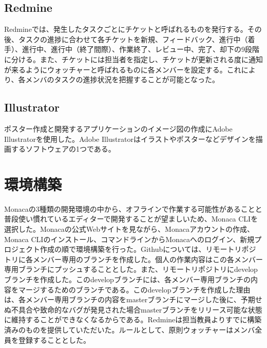 \subsection{Redmine}%
Redmineでは、発生したタスクごとにチケットと呼ばれるものを発行する。その後、タスクの進捗に合わせて各チケットを新規、フィードバック、進行中（着手）、進行中、進行中（終了間際）、作業終了、レビュー中、完了、却下の9段階に分ける。また、チケットには担当者を指定し、チケットが更新される度に通知が来るようにウォッチャーと呼ばれるものに各メンバーを設定する。これにより、各メンバのタスクの進捗状況を把握することが可能となった。
​
​
\subsection{Illustrator}%
ポスター作成と開発するアプリケーションのイメージ図の作成にAdobe Illustratorを使用した。Adobe Illustratorはイラストやポスターなどデザインを描画するソフトウェアの1つである。
​
\section{環境構築}%
Monacaの3種類の開発環境の中から、オフラインで作業する可能性があることと普段使い慣れているエディターで開発することが望ましいため、Monaca CLIを選択した。Monacaの公式Webサイトを見ながら、Monacaアカウントの作成、Monaca CLIのインストール、コマンドラインからMonacaへのログイン、新規プロジェクト作成の順で環境構築を行った。Githubについては、リモートリポジトリに各メンバー専用のブランチを作成した。個人の作業内容はこの各メンバー専用ブランチにプッシュすることとした。また、リモートリポジトリにdevelopブランチを作成した。このdevelopブランチには、各メンバー専用ブランチの内容をマージするためのブランチである。このdevelopブランチを作成した理由は、各メンバー専用ブランチの内容をmasterブランチにマージした後に、予期せぬ不具合や致命的なバグが発見された場合masterブランチをリリース可能な状態に維持することができなくなるからである。Redmineは担当教員よりすでに構築済みのものを提供していただいた。ルールとして、原則ウォッチャーはメンバ全員を登録することとした。
​
​
